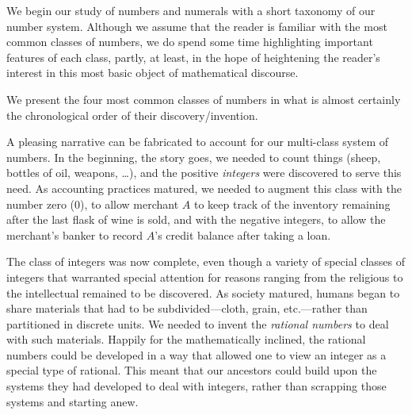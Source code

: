 We begin our study of numbers and numerals with a short taxonomy of
our number system.  Although we assume that the reader is familiar
with the most common classes of numbers, we do spend some time
highlighting important features of each class, partly, at least, in
the hope of heightening the reader's interest in this most basic
object of mathematical discourse.

We present the four most common classes of numbers in what is almost
certainly the chronological order of their discovery/invention.
\medskip

\noindent {}
\medskip

\noindent
A pleasing narrative can be fabricated to account for our multi-class
system of numbers.  In the beginning, the story goes, we needed to
count things (sheep, bottles of oil, weapons, \ldots), and the
positive {\it integers} were discovered to serve
this need.  As accounting practices matured, we needed to augment this
class with the number zero  ($0$), to allow
merchant $A$ to keep track of the inventory remaining after the last
flask of wine is sold, and with the negative integers,
 to allow the merchant's banker to record $A$'s
credit balance after taking a loan.
%
{ }
{}  
%
The class of integers was now complete, even though a variety of
special classes of integers that warranted special attention for
reasons ranging from the religious to the intellectual remained to be
discovered.  As society matured, humans began to share materials that
had to be subdivided---cloth, grain, etc.---rather than partitioned in
discrete units.  We needed to invent the {\it rational numbers}
 to deal with such materials.  Happily for the
mathematically inclined, the rational numbers could be developed in a
way that allowed one to view an integer as a special type of rational.
This meant that our ancestors could build upon the systems they had
developed to deal with integers, rather than scrapping those systems
and starting anew.
\medskip

